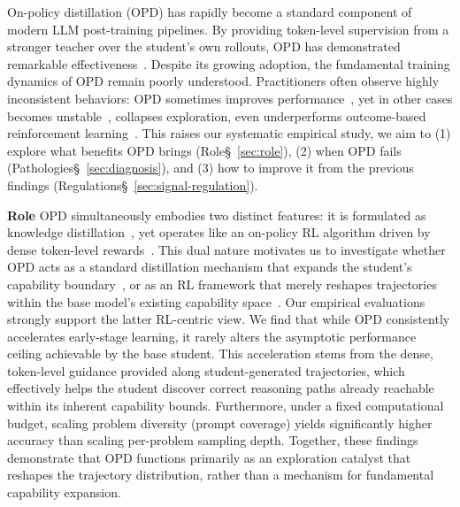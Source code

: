 \documentclass[11pt]{article}
\begin{document}
On-policy distillation (OPD) has rapidly become a standard component of modern LLM post-training pipelines.
By providing token-level supervision from a stronger teacher over the student's own rollouts, OPD has demonstrated remarkable effectiveness~\citep{gu2026minillmonpolicydistillationlarge,qwen3,deepseekai2026deepseekv4}.
Despite its growing adoption, the fundamental training dynamics of OPD remain poorly understood.
Practitioners often observe highly inconsistent behaviors: OPD sometimes improves performance~\cite{lu2025onpolicydistillation}, yet in other cases becomes unstable~\cite{opd-var-1,zhu2026facesonpolicydistillationpitfalls}, collapses exploration, even underperforms outcome-based reinforcement learning~\cite{li2026rethinkingonpolicydistillationlarge}.
This raises our systematic empirical study, we aim to (1) explore what benefits OPD brings ({{Role}}\S~\ref{sec:role}), (2) when OPD fails (Pathologies\S~\ref{sec:diagnosis}), and (3) how to improve it from the previous findings (Regulations\S~\ref{sec:signal-regulation}).


\vspace{0.1mm}
\noindent \textbf{Role}\quad 
OPD simultaneously embodies two distinct features: it is formulated as knowledge distillation~\cite{gu2026minillmonpolicydistillationlarge}, yet operates like an on-policy RL algorithm driven by dense token-level rewards~\cite{gopd}. 
This dual nature motivates us to investigate whether OPD acts as a standard distillation mechanism that expands the student's capability boundary~\cite{hinton2015distillingknowledgeneuralnetwork}, or as an RL framework that merely reshapes trajectories within the base model's existing capability space~\cite{reasoning-bound,RL-no-up}.
Our empirical evaluations strongly support the latter RL-centric view. 
We find that while OPD consistently accelerates early-stage learning, it rarely alters the asymptotic performance ceiling achievable by the base student. 
This acceleration stems from the dense, token-level guidance provided along student-generated trajectories, which effectively helps the student discover correct reasoning paths already reachable within its inherent capability bounds. 
Furthermore, under a fixed computational budget, scaling problem diversity (prompt coverage) yields significantly higher accuracy than scaling per-problem sampling depth. 
Together, these findings demonstrate that OPD functions primarily as an exploration catalyst that reshapes the trajectory distribution, rather than a mechanism for fundamental capability expansion.
\end{document}
